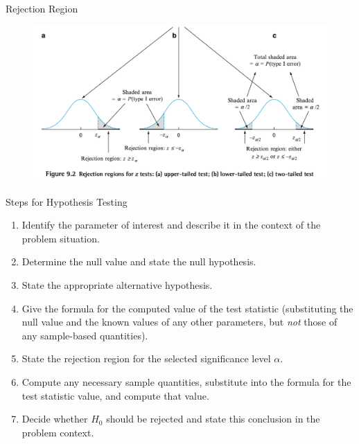 \documentclass[
  ignorenonframetext,
]{beamer}
\providecommand{\tightlist}{%
  \setlength{\itemsep}{0pt}\setlength{\parskip}{0pt}}\usepackage{longtable,booktabs,array}
\begin{document}
\begin{frame}{Rejection Region}
\protect\hypertarget{rejection-region}{}
\begin{figure}

{\centering \includegraphics{images/rejectionregion.png}

}

\end{figure}
\end{frame}

\begin{frame}{Steps for Hypothesis Testing}
\protect\hypertarget{steps-for-hypothesis-testing}{}
\begin{enumerate}[<+->]
\tightlist
\item
  Identify the parameter of interest and describe it in the context of
  the problem situation.
\item
  Determine the null value and state the null hypothesis.
\item
  State the appropriate alternative hypothesis.
\item
  Give the formula for the computed value of the test statistic
  (substituting the null value and the known values of any other
  parameters, but \emph{not} those of any sample-based quantities).
\item
  State the rejection region for the selected significance level
  \(\alpha\).
\item
  Compute any necessary sample quantities, substitute into the formula
  for the test statistic value, and compute that value.
\item
  Decide whether \(H_{0}\) should be rejected and state this conclusion
  in the problem context.
\end{enumerate}
\end{frame}
\end{document}
